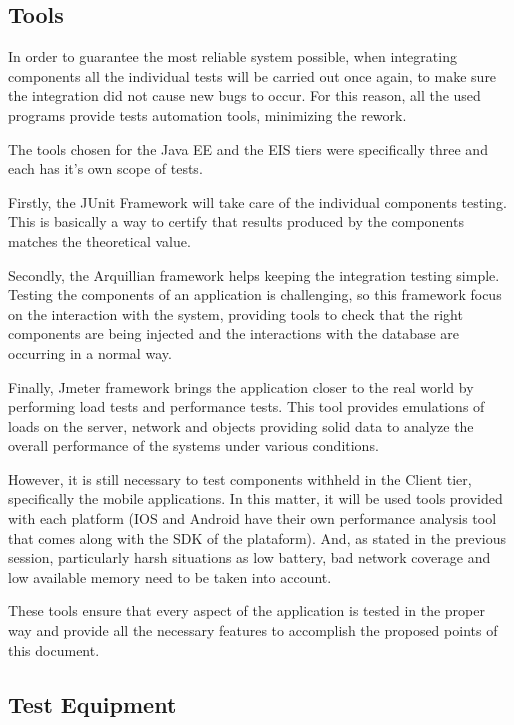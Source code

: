 \documentclass[a4paper]{article}
\begin{document}
\subsection{Tools}

In order to guarantee the most reliable system possible, when integrating components all the individual tests will be carried out once again, to make sure the integration did not cause new bugs to occur. For this reason, all the used programs provide tests automation tools, minimizing the rework. 

The tools chosen for the Java EE and the EIS tiers were specifically three and each has it’s own scope of tests.

Firstly,  the JUnit Framework will take care of the individual components testing. This is basically a way to certify that results produced by the components matches the theoretical value.

Secondly, the Arquillian framework helps keeping the integration testing simple. Testing the components of an application is challenging, so this framework focus on the interaction with the system, providing tools to check that the right components are being injected and the interactions with the database are occurring in a normal way. 

Finally, Jmeter framework brings the application closer to the real world by performing load tests and performance tests. This tool provides emulations of loads on the server, network and objects providing solid data to analyze the overall performance of the systems under various conditions.

However, it is still necessary to  test components withheld in the Client tier,  specifically the mobile applications. In this matter, it will be used tools provided with each platform (IOS and Android have their own performance analysis tool that comes along with the SDK of the plataform). And, as stated in the previous session, particularly harsh situations as low battery, bad network coverage and low available memory need to be taken into account. 

These tools ensure that every aspect of the application is tested in the proper way and provide all the necessary features to accomplish the proposed points of this document.
\newpage

\subsection{Test Equipment}
\end{document}
